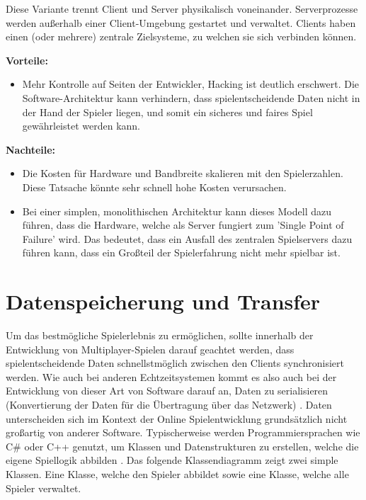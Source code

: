 Diese Variante trennt Client und Server physikalisch voneinander. Serverprozesse werden außerhalb einer Client-Umgebung gestartet und verwaltet. Clients haben einen (oder mehrere) zentrale Zielsysteme, zu welchen sie sich verbinden können.

\textbf{Vorteile:}
\begin{itemize}
	\item Mehr Kontrolle auf Seiten der Entwickler, Hacking ist deutlich erschwert. Die Software-Architektur kann verhindern, dass spielentscheidende Daten nicht in der Hand der Spieler liegen, und somit ein sicheres und faires Spiel gewährleistet werden kann. \cite{Smed.2002}
\end{itemize}

\textbf{Nachteile:}
\begin{itemize}
	\item Die Kosten für Hardware und Bandbreite skalieren mit den Spielerzahlen. Diese Tatsache könnte sehr schnell hohe Kosten verursachen. \cite{Deng.2018}
	\item Bei einer simplen, monolithischen Architektur kann dieses Modell dazu führen, dass die Hardware, welche als Server fungiert zum 'Single Point of Failure' wird. Das bedeutet, dass ein Ausfall des zentralen Spielservers dazu führen kann, dass ein Großteil der Spielerfahrung nicht mehr spielbar ist.
\end{itemize}

\section{Datenspeicherung und Transfer}

Um das bestmögliche Spielerlebnis zu ermöglichen, sollte innerhalb der Entwicklung von Multiplayer-Spielen darauf geachtet werden, dass spielentscheidende Daten schnellstmöglich zwischen den Clients synchronisiert werden. Wie auch bei anderen Echtzeitsystemen \cite{Wikipedia.2021} kommt es also auch bei der Entwicklung von dieser Art von Software darauf an, Daten zu serialisieren (Konvertierung der Daten für die Übertragung über das Netzwerk) \cite{Wikipedia.2019}. Daten unterscheiden sich im Kontext der Online Spielentwicklung grundsätzlich nicht großartig von anderer Software. Typischerweise werden Programmiersprachen wie C\# oder C++ genutzt, um Klassen und Datenstrukturen zu erstellen, welche die eigene Spiellogik abbilden \cite{Glinka.2008}.  Das folgende Klassendiagramm zeigt zwei simple Klassen. Eine Klasse, welche den Spieler abbildet sowie eine Klasse, welche alle Spieler verwaltet.

